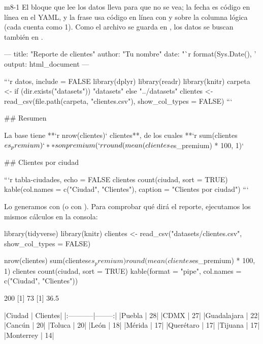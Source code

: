 
\begin{solucion}{m8-1}
El bloque que lee los datos lleva  para que no se
vea; la fecha es código en línea en el YAML, y la frase usa código en línea
con  y  sobre la columna lógica
 (cada  cuenta como 1). Como el archivo se
guarda en , los datos se buscan también en
.
\end{solucion}

\begin{textocodigo}[title=reportes/ej1-clientes.Rmd]
---
title: "Reporte de clientes"
author: "Tu nombre"
date: "`r format(Sys.Date(), '%
output: html_document
---

```{r datos, include = FALSE}
library(dplyr)
library(readr)
library(knitr)
carpeta <- if (dir.exists("datasets")) "datasets" else "../datasets"
clientes <- read_csv(file.path(carpeta, "clientes.csv"),
                     show_col_types = FALSE)
```

## Resumen

La base tiene **`r nrow(clientes)` clientes**, de los cuales
**`r sum(clientes$es_premium)`** son premium
(`r round(mean(clientes$es_premium) * 100, 1)` %

## Clientes por ciudad

```{r tabla-ciudades, echo = FALSE}
clientes %
  count(ciudad, sort = TRUE) %
  kable(col.names = c("Ciudad", "Clientes"),
        caption = "Clientes por ciudad")
```
\end{textocodigo}

Lo generamos con  (o con
). Para comprobar
qué dirá el reporte, ejecutamos los mismos cálculos en la consola:

\begin{rcode}
library(tidyverse)
library(knitr)
clientes <- read_csv("datasets/clientes.csv", show_col_types = FALSE)
\end{rcode}

\begin{rcode}
nrow(clientes)
sum(clientes$es_premium)
round(mean(clientes$es_premium) * 100, 1)
clientes %
  count(ciudad, sort = TRUE) %
  kable(format = "pipe", col.names = c("Ciudad", "Clientes"))
\end{rcode}
\begin{rsalida}
[1] 200
[1] 73
[1] 36.5


|Ciudad      | Clientes|
|:-----------|--------:|
|Puebla      |       28|
|CDMX        |       27|
|Guadalajara |       22|
|Cancún      |       20|
|Toluca      |       20|
|León        |       18|
|Mérida      |       17|
|Querétaro   |       17|
|Tijuana     |       17|
|Monterrey   |       14|
\end{rsalida}

